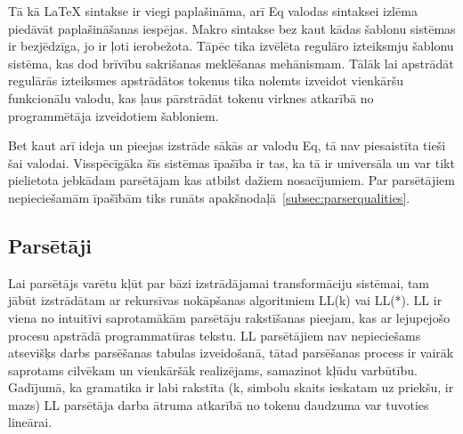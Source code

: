 Tā kā \LaTeX{} sintakse ir viegi paplašināma, arī Eq valodas sintaksei izlēma piedāvāt paplašināšanas iespējas. Makro sintakse bez kaut kādas šablonu sistēmas ir bezjēdzīga, jo ir ļoti ierobežota. Tāpēc tika izvēlēta regulāro izteiksmju šablonu sistēma, kas dod brīvību sakrišanas meklēšanas mehānismam. Tālāk lai apstrādāt regulārās izteiksmes apstrādātos tokenus tika nolemts izveidot vienkāršu funkcionālu valodu, kas ļaus pārstrādāt tokenu virknes atkarībā no programmētāja izveidotiem šabloniem.

Bet kaut arī ideja un pieejas izstrāde sākās ar valodu Eq, tā nav piesaistīta tieši šai valodai. Visspēcīgāka šīs sistēmas īpašība ir tas, ka tā ir universāla un var tikt pielietota jebkādam parsētājam kas atbilst dažiem nosacījumiem. Par parsētājiem nepieciešamām īpašībām tiks runāts apakšnodaļā~\ref{subsec:parserqualities}.

\subsection{\label{subsec:parserqualities}Parsētāji}
Lai parsētājs varētu kļūt par bāzi izstrādājamai transformāciju sistēmai, tam jābūt izstrādātam ar rekursīvas nokāpšanas algoritmiem LL(k) vai LL(*). LL ir viena no intuitīvi saprotamākām parsētāju rakstīšanas pieejam, kas ar lejupejošo procesu apstrādā programmatūras tekstu. LL parsētājiem nav nepieciešams atsevišķs darbs parsēšanas tabulas izveidošanā, tātad parsēšanas process ir vairāk saprotams cilvēkam un vienkāršāk realizējams, samazinot kļūdu varbūtību. Gadījumā, ka gramatika ir labi rakstīta (k, simbolu skaits ieskatam uz priekšu, ir mazs) LL parsētāja darba ātruma atkarībā no tokenu daudzuma var tuvoties lineārai. \cite{Lewis:LLParsers}

